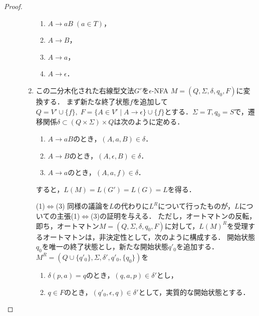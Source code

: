 \begin{proof}
\begin{description}
\begin{enumerate}
            \begin{enumerate}
                \item $A\to aB\;(a\in T)$，
                \item $A\to B$，
                \item $A\to a$，
                \item $A\to\epsilon$．
            \end{enumerate}
            \item この二分木化された右線型文法$G'$を$\epsilon$-NFA $M=(Q,\Sigma,\delta,q_0,F)$に変換する．
            まず新たな終了状態$f$を追加して$Q=V'\cup\{f\},\;F=\{A\in V'\mid A\to\epsilon\}\cup\{f\}$とする．$\Sigma=T,q_0=S$で，遷移関係$\delta\subset (Q\times\Sigma)\times Q$は次のように定める．
            \begin{enumerate}
                \item $A\to aB$のとき，$(A,a,B)\in\delta$．
                \item $A\to B$のとき，$(A,\epsilon,B)\in\delta$．
                \item $A\to a$のとき，$(A,a,f)\in\delta$．
            \end{enumerate}
            すると，$L(M)=L(G')=L(G)=L$を得る．
            \item[(1)$\Leftrightarrow$(3)]
            同様の議論を$L$の代わりに$L^R$について行ったものが，$L$についての主張(1)$\Leftrightarrow$(3)の証明を与える．
            ただし，オートマトンの反転，即ち，オートマトン$M=(Q,\Sigma,\delta,q_0,F)$に対して，$L(M)^R$を受理するオートマトンは，非決定性として，次のように構成する．
            開始状態$q_0$を唯一の終了状態とし，新たな開始状態$q'_0$を追加する．
            $M^R=(Q\cup\{q'_0\},\Sigma,\delta',q'_0,\{q_0\})$を
            \begin{enumerate}
                \item $\delta(p,a)=q$のとき，$(q,a,p)\in\delta'$とし，
                \item $q\in F$のとき，$(q'_0,\epsilon,q)\in\delta'$として，実質的な開始状態とする．
            \end{enumerate}
        \end{enumerate}
    \end{description}
\end{proof}
